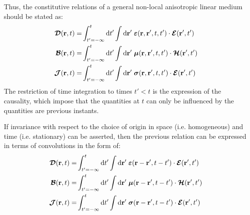 Thus, the constitutive relations of a general non-local anisotropic linear medium should be stated as:
\begin{subequations}
	\begin{align}
	\boldsymbol{\mathcal{D}}(\mathbf{r}, t) 
	= &
	\int_{t'=-\infty}^t \mathop{}\!\mathrm{d} t'
	\int \mathop{}\!\mathrm{d} \mathbf{r}' \;
	\boldsymbol{\varepsilon}(\mathbf{r},\mathbf{r}', t,t') \cdot \boldsymbol{\mathcal{E}}(\mathbf{r}', t') 
	\\
	\boldsymbol{\mathcal{B}}(\mathbf{r}, t)
	=& 
	\int_{t'=-\infty}^t \mathop{}\!\mathrm{d} t'
	\int \mathop{}\!\mathrm{d} \mathbf{r}' \;
	\boldsymbol{\mu}(\mathbf{r},\mathbf{r}', t,t') \cdot \boldsymbol{\mathcal{H}}(\mathbf{r}', t')  
	\\
	\boldsymbol{\mathcal{J}}(\mathbf{r}, t)
	=& 
	\int_{t'=-\infty}^t \mathop{}\!\mathrm{d} t'
	\int \mathop{}\!\mathrm{d} \mathbf{r}' \;
	\boldsymbol{\sigma}(\mathbf{r},\mathbf{r}', t,t') \cdot \boldsymbol{\mathcal{E}}(\mathbf{r}', t')  
	\end{align}
\end{subequations}
The restriction of time integration to times $t'<t$ is the expression of the causality, which impose that the quantities at $t$ can only be influenced by the quantities are previous instants.

If invariance with respect to the choice of origin in space (i.e. homogeneous) and time (i.e. stationary) can be asserted, then the previous relation can be expressed in terms of convolutions in the form of\parencite[p.19]{Brambilla1998}:
\begin{subequations}
	\begin{align}
	\boldsymbol{\mathcal{D}}(\mathbf{r}, t) 
	= &
	\int_{t'=-\infty}^t \mathop{}\!\mathrm{d} t'
	\int \mathop{}\!\mathrm{d} \mathbf{r}' \;
	\boldsymbol{\varepsilon}(\mathbf{r}-\mathbf{r}', t-t') \cdot \boldsymbol{\mathcal{E}}(\mathbf{r}', t') 
	\\
	\boldsymbol{\mathcal{B}}(\mathbf{r}, t)
	=& 
	\int_{t'=-\infty}^t \mathop{}\!\mathrm{d} t'
	\int \mathop{}\!\mathrm{d} \mathbf{r}' \;
	\boldsymbol{\mu}(\mathbf{r}-\mathbf{r}', t-t') \cdot \boldsymbol{\mathcal{H}}(\mathbf{r}', t')  
	\\
	\boldsymbol{\mathcal{J}}(\mathbf{r}, t)
	=& 
	\int_{t'=-\infty}^t \mathop{}\!\mathrm{d} t'
	\int \mathop{}\!\mathrm{d} \mathbf{r}' \;
	\boldsymbol{\sigma}(\mathbf{r}-\mathbf{r}', t-t') \cdot \boldsymbol{\mathcal{E}}(\mathbf{r}', t')  
	\end{align}
\end{subequations}


